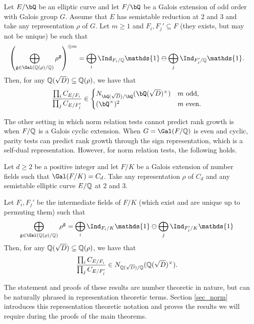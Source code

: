 \begin{thm}%
    Let $E / \bQ$ be an elliptic curve and let $F / \bQ$ be a Galois extension of odd order with Galois group $G$. Assume that $E$ has semistable reduction at $2$ and $3$ and take any representation $\rho$ of $G$. Let $m\geq 1$ and $F_i,F_j'\subseteq F$ (they exists, but may not be unique) be such that 
    \begin{equation*}%
        \left(\bigoplus_{\mathfrak{g}\in\Gal(\QQ(\rho)/\QQ)}\rho^{\mathfrak{g}}\right)^{\oplus m }=\bigoplus_i\Ind_{F_i/\QQ}\mathds{1}\ominus\bigoplus_j\Ind_{F'_j/\QQ}\mathds{1}.
    \end{equation*}
    Then, for any $\mathbb{Q}(\sqrt{D})\subseteq\mathbb{Q}(\rho)$, we have that
    \[ \frac{\prod_i C_{E/F_i}}{\prod_j C_{E/F_j'}}  \in 
       \begin{cases}
           N_{\bQ(\sqrt{D}) / \bQ}(\bQ(\sqrt{D})^{\times}) & m \ \text{odd}, \\
           (\bQ^{\times})^2 & m \ \text{even}.
       \end{cases} 
    \] 
\end{thm}

The other setting in which norm relation tests cannot predict rank growth is when $F/\mathbb{Q}$ is a Galois cyclic extension. When $G=\Gal(F/\QQ)$ is even and cyclic, parity tests can predict rank growth through the sign representation, which is a self-dual representation. However, for norm relation tests, the following holds.

\begin{thm}%
    Let $d\geq2$ be a positive integer and let $F/K$ be a Galois extension of number fields such that $\Gal(F/K)=C_d$. Take any representation $\rho$ of $C_d$ and any semistable elliptic curve $E/\mathbb{Q}$ at $2$ and $3$. 
    
    Let $F_i,F_j'$ be the intermediate fields of $F/K$ (which exist and are unique up to permuting them) such that 
    \begin{equation*}%
        \bigoplus_{\mathfrak{g}\in\Gal(\QQ(\rho)/\QQ)}\rho^{\mathfrak{g}}=\bigoplus_i\Ind_{F_i/K}\mathds{1}\ominus\bigoplus_j\Ind_{F'_j/K}\mathds{1}
    \end{equation*}
    Then, for any $\mathbb{Q}(\sqrt{D})\subseteq\mathbb{Q}(\rho)$, we have that
    $$\frac{\prod_i C_{E/F_i}}{\prod_j C_{E/F_j'}}\in N_{\mathbb{Q}(\sqrt{D})/\mathbb{Q}}(\mathbb{Q}(\sqrt{D})^{\times}).$$
\end{thm}

The statement and proofs of these results are number theoretic in nature, but can be naturally phrased in representation theoretic terms. Section \ref{sec_norm} introduces this representation theoretic notation and proves the results we will require during the proofs of the main theorems.  
